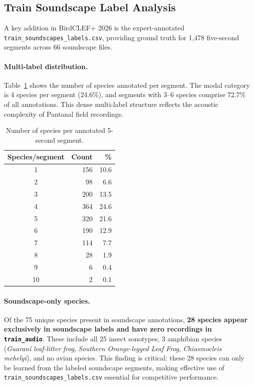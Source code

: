 \subsection{Train Soundscape Label Analysis}
\label{sec:eda:soundscapes}

A key addition in BirdCLEF+ 2026 is the expert-annotated \texttt{train\_soundscapes\_labels.csv},
providing ground truth for 1{,}478 five-second segments across 66 soundscape files.

\paragraph{Multi-label distribution.}
Table~\ref{tab:multilabel} shows the number of species annotated per segment.
The modal category is 4 species per segment (24.6\%), and segments with 3--6 species
comprise 72.7\% of all annotations. This dense multi-label structure reflects the
acoustic complexity of Pantanal field recordings.

\begin{table}[h]
\centering
\caption{Number of species per annotated 5-second segment.}
\label{tab:multilabel}
\begin{tabular}{crr}
\hline
\textbf{Species/segment} & \textbf{Count} & \textbf{\%} \\
\hline
1  & 156  & 10.6 \\
2  &  98  &  6.6 \\
3  & 200  & 13.5 \\
4  & 364  & 24.6 \\
5  & 320  & 21.6 \\
6  & 190  & 12.9 \\
7  & 114  &  7.7 \\
8  &  28  &  1.9 \\
9  &   6  &  0.4 \\
10 &   2  &  0.1 \\
\hline
\end{tabular}
\end{table}

\paragraph{Soundscape-only species.}
Of the 75 unique species present in soundscape annotations, \textbf{28 species appear
exclusively in soundscape labels and have zero recordings in \texttt{train\_audio}}.
These include all 25 insect sonotypes, 3 amphibian species
(\textit{Guaraní leaf-litter frog}, \textit{Southern Orange-legged Leaf Frog},
\textit{Chiasmocleis mehelyi}), and no avian species.
This finding is critical: these 28 species can only be learned from the
labeled soundscape segments, making effective use of \texttt{train\_soundscapes\_labels.csv}
essential for competitive performance.

